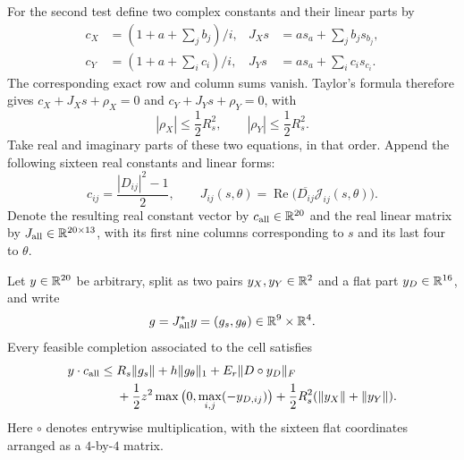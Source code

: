 For the second test define two complex constants and their linear parts by
\begin{align*}
 c_X&=(1+a+\textstyle\sum_j b_j)/i,&
 J_Xs&=a s_a+\textstyle\sum_j b_j s_{b_j},\\
 c_Y&=(1+a+\textstyle\sum_i c_i)/i,&
 J_Ys&=a s_a+\textstyle\sum_i c_i s_{c_i}.
\end{align*}
The corresponding exact row and column sums vanish.  Taylor's formula
therefore gives $c_X+J_Xs+\rho_X=0$ and
$c_Y+J_Ys+\rho_Y=0$, with
\begin{equation}
\label{completion:seed-sum-remainders}
 |\rho_X|\le\frac12R_s^2,\qquad
 |\rho_Y|\le\frac12R_s^2.
\end{equation}
Take real and imaginary parts of these two equations, in that order.
Append the following sixteen real constants and linear forms:
\begin{equation}
\label{completion:flat-equations}
 c_{ij}=\frac{|D_{ij}|^2-1}{2},\qquad
 J_{ij}(s,\theta)
 =\operatorname{Re}\big(\overline{D_{ij}}\mathcal J_{ij}(s,\theta)\big).
\end{equation}
Denote the resulting real constant vector by $c_{\rm all}\in\mathbb R^{20}$
and the real linear matrix by $J_{\rm all}\in\mathbb R^{20\times13}$, with
its first nine columns corresponding to $s$ and its last four to $\theta$.

\begin{lemma}
\label{completion:directional-exclusion}
Let $y\in\mathbb R^{20}$ be arbitrary, split as two pairs $y_X,y_Y\in\mathbb R^2$
and a flat part $y_D\in\mathbb R^{16}$, and write
\[
 g=J_{\rm all}^*y=(g_s,g_\theta)\in\mathbb R^9\times\mathbb R^4.
\]
Every feasible completion associated to the cell satisfies
\begin{equation}
\label{completion:directional-test}
 \begin{split}
 y\cdot c_{\rm all}\le{}&
 R_s\lVert g_s\rVert+h\lVert g_\theta\rVert_1
 +E_r\lVert D\circ y_D\rVert_F\\
 &+\frac12z^2\max\big(0,\max_{i,j}(-y_{D,ij})\big)
 +\frac12R_s^2(\lVert y_X\rVert+\lVert y_Y\rVert).
 \end{split}
\end{equation}
Here $\circ$ denotes entrywise multiplication, with the sixteen flat
coordinates arranged as a $4$-by-$4$ matrix.
\end{lemma}

